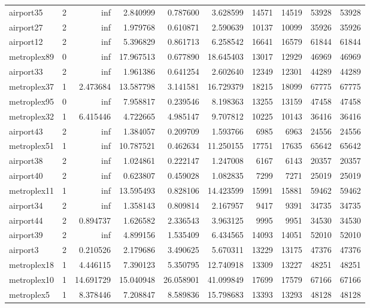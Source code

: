 \begin{longtable}{|l|r|r|r|r|r|r|r|r|r|}
airport35 & 2 & inf & 2.840999 & 0.787600 & 3.628599 & 14571 & 14519 & 53928 & 53928 \\
airport27 & 2 & inf & 1.979768 & 0.610871 & 2.590639 & 10137 & 10099 & 35926 & 35926 \\
airport12 & 2 & inf & 5.396829 & 0.861713 & 6.258542 & 16641 & 16579 & 61844 & 61844 \\
metroplex89 & 0 & inf & 17.967513 & 0.677890 & 18.645403 & 13017 & 12929 & 46969 & 46969 \\
airport33 & 2 & inf & 1.961386 & 0.641254 & 2.602640 & 12349 & 12301 & 44289 & 44289 \\
metroplex37 & 1 & 2.473684 & 13.587798 & 3.141581 & 16.729379 & 18215 & 18099 & 67775 & 67775 \\
metroplex95 & 0 & inf & 7.958817 & 0.239546 & 8.198363 & 13255 & 13159 & 47458 & 47458 \\
metroplex32 & 1 & 6.415446 & 4.722665 & 4.985147 & 9.707812 & 10225 & 10143 & 36416 & 36416 \\
airport43 & 2 & inf & 1.384057 & 0.209709 & 1.593766 & 6985 & 6963 & 24556 & 24556 \\
metroplex51 & 1 & inf & 10.787521 & 0.462634 & 11.250155 & 17751 & 17635 & 65642 & 65642 \\
airport38 & 2 & inf & 1.024861 & 0.222147 & 1.247008 & 6167 & 6143 & 20357 & 20357 \\
airport40 & 2 & inf & 0.623807 & 0.459028 & 1.082835 & 7299 & 7271 & 25019 & 25019 \\
metroplex11 & 1 & inf & 13.595493 & 0.828106 & 14.423599 & 15991 & 15881 & 59462 & 59462 \\
airport34 & 2 & inf & 1.358143 & 0.809814 & 2.167957 & 9417 & 9391 & 34735 & 34735 \\
airport44 & 2 & 0.894737 & 1.626582 & 2.336543 & 3.963125 & 9995 & 9951 & 34530 & 34530 \\
airport39 & 2 & inf & 4.899156 & 1.535409 & 6.434565 & 14093 & 14051 & 52010 & 52010 \\
airport3 & 2 & 0.210526 & 2.179686 & 3.490625 & 5.670311 & 13229 & 13175 & 47376 & 47376 \\
metroplex18 & 1 & 4.446115 & 7.390123 & 5.350795 & 12.740918 & 13309 & 13227 & 48251 & 48251 \\
metroplex10 & 1 & 14.691729 & 15.040948 & 26.058901 & 41.099849 & 17699 & 17579 & 67166 & 67166 \\
metroplex5 & 1 & 8.378446 & 7.208847 & 8.589836 & 15.798683 & 13393 & 13293 & 48128 & 48128 \\

\end{longtable}
